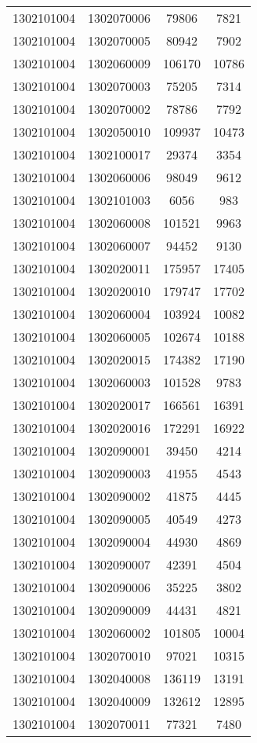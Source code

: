 \begin{longtable}{llcc}
1302101004 & 1302070006 & 79806 & 7821\\
1302101004 & 1302070005 & 80942 & 7902\\
1302101004 & 1302060009 & 106170 & 10786\\
1302101004 & 1302070003 & 75205 & 7314\\
1302101004 & 1302070002 & 78786 & 7792\\
1302101004 & 1302050010 & 109937 & 10473\\
1302101004 & 1302100017 & 29374 & 3354\\
1302101004 & 1302060006 & 98049 & 9612\\
1302101004 & 1302101003 & 6056 & 983\\
1302101004 & 1302060008 & 101521 & 9963\\
1302101004 & 1302060007 & 94452 & 9130\\
1302101004 & 1302020011 & 175957 & 17405\\
1302101004 & 1302020010 & 179747 & 17702\\
1302101004 & 1302060004 & 103924 & 10082\\
1302101004 & 1302060005 & 102674 & 10188\\
1302101004 & 1302020015 & 174382 & 17190\\
1302101004 & 1302060003 & 101528 & 9783\\
1302101004 & 1302020017 & 166561 & 16391\\
1302101004 & 1302020016 & 172291 & 16922\\
1302101004 & 1302090001 & 39450 & 4214\\
1302101004 & 1302090003 & 41955 & 4543\\
1302101004 & 1302090002 & 41875 & 4445\\
1302101004 & 1302090005 & 40549 & 4273\\
1302101004 & 1302090004 & 44930 & 4869\\
1302101004 & 1302090007 & 42391 & 4504\\
1302101004 & 1302090006 & 35225 & 3802\\
1302101004 & 1302090009 & 44431 & 4821\\
1302101004 & 1302060002 & 101805 & 10004\\
1302101004 & 1302070010 & 97021 & 10315\\
1302101004 & 1302040008 & 136119 & 13191\\
1302101004 & 1302040009 & 132612 & 12895\\
1302101004 & 1302070011 & 77321 & 7480\\

\end{longtable}
